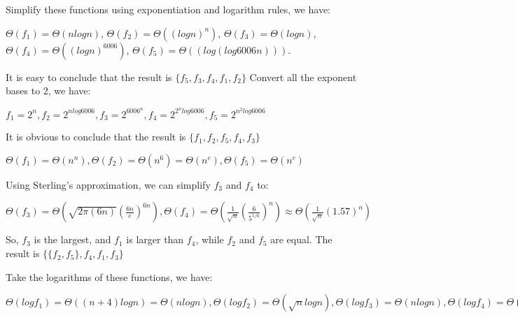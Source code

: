 \documentclass[12pt,twoside]{article}
\begin{document}


\begin{problems}

\problem  %

\begin{problemparts}
\problempart %
Simplify these functions using exponentiation and logarithm rules, we have:

$\Theta(f_1) = \Theta(nlogn)$, $\Theta(f_2) = \Theta((logn)^n)$, $\Theta(f_3) = \Theta(logn)$, $\Theta(f_4) = \Theta((logn)^{6006})$, $\Theta(f_5) = \Theta((log(log6006n)))$. 

It is easy to conclude that the result is $\{f_5,f_3,f_4,f_1,f_2\}$
\problempart %
Convert all the exponent bases to 2, we have:

$f_1 = 2^n, f_2 = 2^{nlog6006}, f_3 = 2^{6006^n}, f_4 = 2^{2^nlog6006}, f_5 = 2^{n^2log6006}$

It is obvious to conclude that the result is $\{f_1, f_2, f_5, f_4, f_3\}$

\problempart %
$\Theta(f_1) = \Theta(n^n), \Theta(f_2) = \Theta(n^6) = \Theta(n^c), \Theta(f_5) = \Theta(n^c)$

Using Sterling's approximation, we can simplify $f_3$ and $f_4$ to:

$\Theta(f_3) = \Theta(\sqrt{2\pi(6n)}(\displaystyle\frac{6n}{e})^{6n}), \Theta(f_4) = \Theta(\frac{1}{\displaystyle\sqrt{n}}(\displaystyle\frac{6}{5^{5/6}})^n) \approx \Theta(\frac{1}{\displaystyle\sqrt{n}}(1.57)^n)$ 

So, $f_3$ is the largest, and $f_1$ is larger than $f_4$, while $f_2$ and $f_5$ are equal. The result is $\{\{f_2,f_5\}, f_4, f_1,f_3\}$

\problempart %
Take the logarithms of these functions, we have:

$\Theta(logf_1) = \Theta((n+4)logn)=\Theta(nlogn),\Theta(logf_2)=\Theta(\sqrt{n}logn),\Theta(logf_3)=\Theta(nlogn), \Theta(logf_4)=\Theta(n^2), \Theta(logf_5)=\Theta(logn)$


\end{problemparts}
\end{problems}
\end{document}
